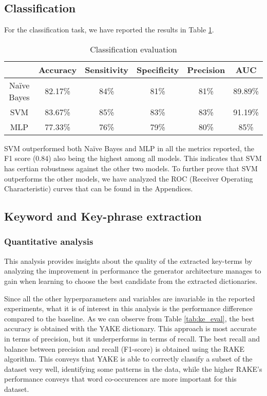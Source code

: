 \subsection{Classification}
For the classification task, we have reported the results in Table \ref{tab:evaluation}.
\begin{table}[!htb]
  \centering
    \begin{tabular}{|c|c|c|c|c|c|}
    \hline
    &Accuracy&Sensitivity&Specificity&Precision&AUC\\
    \hline
    Naïve Bayes&82.17\%&84\%&81\%&81\%&89.89\%\\
    \hline
    SVM&83.67\%&85\%&83\%&83\%&91.19\%\\
    \hline
    MLP&77.33\%&76\%&79\%&80\%&85\%\\
    \hline
    \end{tabular}
    \caption{Classification evaluation}
    \label{tab:evaluation}
\end{table}

SVM outperformed both Naïve Bayes and MLP in all the metrics reported, the F1 score (0.84) also being the highest among all models. This indicates that SVM has certian robustness against the other two models. To further prove that SVM outperforms the other models, we have analyzed the ROC (Receiver Operating Characteristic) curves that can be found in the Appendices.

\subsection{Keyword and Key-phrase extraction}
\subsubsection{Quantitative analysis}
This analysis provides insights about the quality of the extracted key-terms by analyzing the improvement in performance the generator architecture manages to gain when learning to choose the best candidate from the extracted dictionaries.

Since all the other hyperparameters and variables are invariable in the reported experiments, what it is of interest in this analysis is the performance difference compared to the baseline. 
As we can observe from Table \ref{tab:ke_eval}, the best accuracy is obtained with the YAKE dictionary. This approach is most accurate in terms of precision, but it underperforms in terms of recall. The best recall and balance between precision and recall (F1-score) is obtained using the RAKE algorithm. This conveys that YAKE is able to correctly classify a subset of the dataset very well, identifying some patterns in the data, while the higher RAKE's performance conveys that word co-occurences are more important for this dataset.

